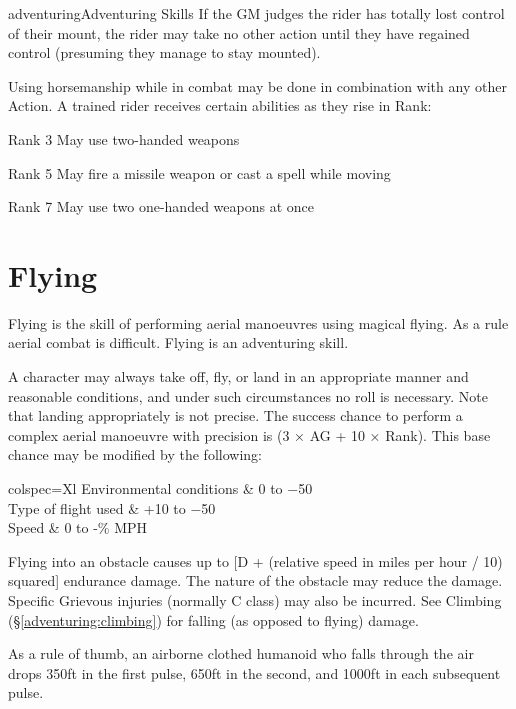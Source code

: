\begin{Skill}[1.2]{adventuring}{Adventuring Skills}
If the GM judges the rider has totally lost control of their mount,
the rider may take no other action until they have regained control
(presuming they manage to stay mounted).

Using horsemanship while in combat may be done in combination with any
other Action.  A trained rider receives certain abilities as they rise
in Rank:

\begin{Description}

\item[Rank 3] May use two-handed weapons
  
\item [Rank 5] May fire a missile weapon or cast a spell while moving

\item [Rank 7] May use two one-handed weapons at once

\end{Description}

\section{Flying}

Flying is the skill of performing aerial manoeuvres using magical
flying.  As a rule aerial combat is difficult. Flying is an
adventuring skill.

A character may always take off, fly, or land in an appropriate manner
and reasonable conditions, and under such circumstances no roll is
necessary. Note that landing appropriately is not precise.  The
success chance to perform a complex aerial manoeuvre with precision is
(3 × AG + 10 × Rank).  This base chance may be modified by the
following:

\begin{dqtblr}{colspec={Xl}}
Environmental conditions	& 0 to −50 \\
Type of flight used		& +10 to −50 \\
Speed				& 0 to -\% MPH \\
\end{dqtblr}

Flying into an obstacle causes up to [D + (relative speed in miles per
hour / 10) squared] endurance damage. The nature of the obstacle may
reduce the damage.  Specific Grievous injuries (normally C class) may
also be incurred.  See Climbing (\S\ref{adventuring:climbing}) for
falling (as opposed to flying) damage.

As a rule of thumb, an airborne clothed humanoid who falls through the
air drops 350ft in the first pulse, 650ft in the second, and 1000ft in
each subsequent pulse.


\end{Skill}
